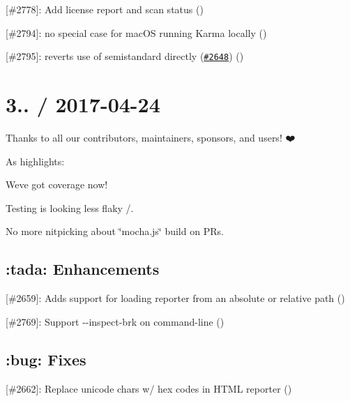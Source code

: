 \begin{DoxyItemize}
\item \mbox{[}\#2778\mbox{]}\+: Add license report and scan status (\href{https://github.com/xizhao}{\tt })
\item \mbox{[}\#2794\mbox{]}\+: no special case for mac\+OS running Karma locally (\href{https://github.com/boneskull}{\tt })
\item \mbox{[}\#2795\mbox{]}\+: reverts use of semistandard directly (\href{https://github.com/mochajs/mocha/pull/2648}{\tt \#2648}) (\href{https://github.com/boneskull}{\tt })
\end{DoxyItemize}

\section*{3.. / 2017-\/04-\/24}

Thanks to all our contributors, maintainers, sponsors, and users! ❤️

As highlights\+:


\begin{DoxyItemize}
\item We\textquotesingle{}ve got coverage now!
\item Testing is looking less flaky /.
\item No more nitpicking about \char`\"{}mocha.\+js\char`\"{} build on P\+Rs.
\end{DoxyItemize}

\subsection*{\+:tada\+: Enhancements}


\begin{DoxyItemize}
\item \mbox{[}\#2659\mbox{]}\+: Adds support for loading reporter from an absolute or relative path (\href{https://github.com/sul4bh}{\tt })
\item \mbox{[}\#2769\mbox{]}\+: Support {\ttfamily -\/-\/inspect-\/brk} on command-\/line (\href{https://github.com/igwejk}{\tt })
\end{DoxyItemize}

\subsection*{\+:bug\+: Fixes}


\begin{DoxyItemize}
\item \mbox{[}\#2662\mbox{]}\+: Replace unicode chars w/ hex codes in H\+T\+ML reporter (\href{https://github.com/rotemdan}{\tt })
\end{DoxyItemize}

